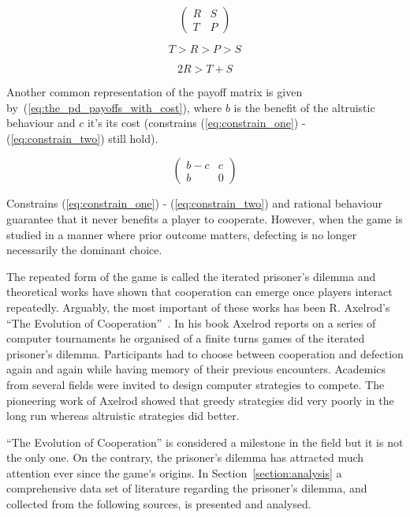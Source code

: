 \documentclass{article}
\theoremstyle{definition}
\begin{document}
\begin{equation} \label{eq:the_pd_payoffs}
    \begin{pmatrix}
    R & S \\ T & P
    \end{pmatrix}
\end{equation}

\begin{equation}\label{eq:constrain_one}
    T > R > P > S
\end{equation}

\begin{equation}\label{eq:constrain_two}
    2R > T + S
\end{equation}

Another common representation of the payoff matrix is given by~(\ref{eq:the_pd_payoffs_with_cost}),
where \(b\) is the benefit of the altruistic behaviour and \(c\) it's its cost
(constrains (\ref{eq:constrain_one}) - (\ref{eq:constrain_two}) still hold).

\begin{equation}\label{eq:the_pd_payoffs_with_cost}
    \begin{pmatrix}
        b - c & c \\ b & 0
    \end{pmatrix}
\end{equation}

Constrains (\ref{eq:constrain_one}) - (\ref{eq:constrain_two}) and rational behaviour
guarantee that it never benefits a player to cooperate. However,
when the game is studied in a manner where prior outcome matters,
defecting is no longer necessarily the dominant choice.

The repeated form of the game is called the iterated prisoner's dilemma and theoretical
works have shown that cooperation can emerge once players interact repeatedly.
Arguably, the most important of these works has been R. Axelrod's
``The Evolution of Cooperation''~\cite{Axelrod1984}.
In his book Axelrod reports on a series of computer tournaments he organised of
a finite turns games of the iterated prisoner's dilemma. Participants
had to choose between cooperation and defection again and again while having
memory of their previous encounters. Academics from several fields were invited to
design computer strategies to compete. The pioneering work of Axelrod
showed that greedy strategies did very poorly in the long run whereas altruistic
strategies did better.

``The Evolution of Cooperation'' is considered a milestone in the field but it
is not the only one. On the contrary, the prisoner's dilemma has attracted much
attention ever since the game's origins. In Section~\ref{section:analysis} a comprehensive
data set of literature regarding the prisoner's dilemma, and collected from
the following sources, is presented and analysed.
\end{document}

